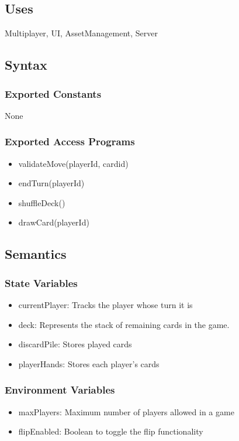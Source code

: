 \documentclass[12pt, titlepage]{article}
\begin{document}
\subsection{Uses}
\hspace{1.5em}Multiplayer, UI, AssetManagement, Server

\subsection{Syntax}

\subsubsection{Exported Constants}
\hspace{1.5em}None

\subsubsection{Exported Access Programs}

\begin{itemize}
\item validateMove(playerId, cardid)
\item endTurn(playerId)
\item shuffleDeck()
\item drawCard(playerId)
\end{itemize}

\subsection{Semantics}

\subsubsection{State Variables}
\begin{itemize}
\item currentPlayer: Tracks the player whose turn it is
\item deck: Represents the stack of remaining cards in the game.
\item discardPile: Stores played cards
\item playerHands: Stores each player's cards
\end{itemize}

\subsubsection{Environment Variables}
\begin{itemize}
\item maxPlayers: Maximum number of players allowed in a game
\item flipEnabled: Boolean to toggle the flip functionality
\end{itemize}
\end{document}
